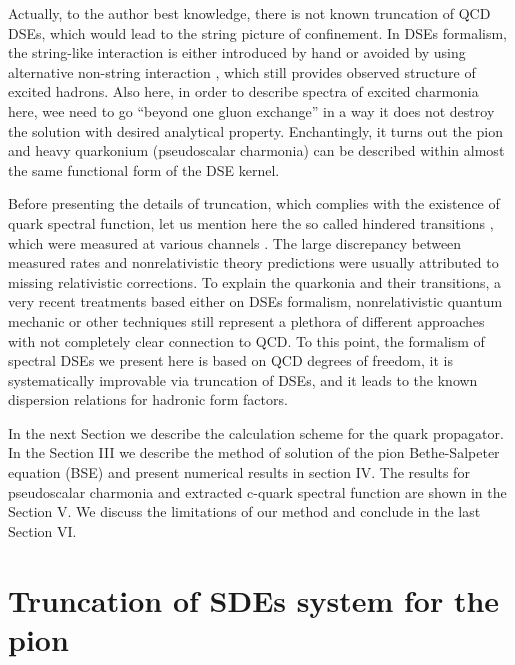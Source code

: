 \documentclass[aps,prd,superscriptaddress,eqsecnum,amsfonts,showpacs,epsfig]{revtex4}
\begin{document}
 
 Actually, to the author best knowledge, there is not known truncation of QCD DSEs, which would lead to  the  string picture of confinement.  In DSEs formalism, the string-like interaction is either introduced  by hand \cite{saulieta,saulipsy} or 
  avoided  by using alternative non-string interaction \cite{HPGK2015}, which still  provides observed structure of excited hadrons.
Also here,  in order to describe spectra of excited charmonia here, wee need to go ``beyond one gluon exchange'' in a way  it does not destroy the solution with desired  analytical
 property. Enchantingly, it turns out the pion and heavy quarkonium (pseudoscalar charmonia) can be described within almost the same functional form of the  DSE  kernel.  
   


Before presenting the details of truncation, which complies with the existence of quark spectral function, let  us mention here the  so called hindered transitions , which were measured at various channels \cite{hind,hind1,hind2}.
  The  large  discrepancy between  measured rates and nonrelativistic theory predictions 
were usually  attributed to missing relativistic corrections.
 To explain the quarkonia and  their  transitions, a very recent  treatments based either on  DSEs formalism, nonrelativistic  quantum mechanic or other techniques \cite{GUGEBH2021,JUHUCHA2021,BG2020,SG2020,BGPSS2019,SJS2018,LLMV2018,DLGZ2017,BS2013,LZ2011}
 still represent a plethora of  different approaches with not completely clear connection  to QCD.
To this point, the  formalism of spectral DSEs we  present here is based on QCD degrees of freedom, it is systematically  improvable via truncation of DSEs, and  it  leads  to the known dispersion relations for  hadronic form factors.
 
  In the next  Section we describe  the calculation scheme for  the quark propagator. In the Section III we describe the method of solution of the pion Bethe-Salpeter equation (BSE) and present numerical results in section IV.  The results for pseudoscalar charmonia and extracted c-quark spectral function are shown in the Section V. We discuss the limitations of our  method  and conclude in the last Section VI.
 

 
 \section{Truncation of SDEs system for the pion}
 
\end{document}
